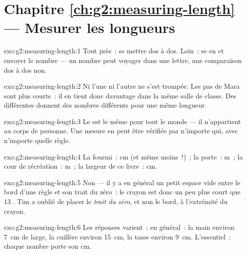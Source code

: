 \section*{Chapitre \ref{ch:g2:measuring-length} --- Mesurer les longueurs}

\begin{solution}{exo:g2:measuring-length:1}
Tout près~: se mettre dos à dos. Loin~: se  en  et
envoyer le nombre --- un nombre peut voyager dans une lettre, une
comparaison dos à dos non.
\end{solution}

\begin{solution}{exo:g2:measuring-length:2}
Ni l'une ni l'autre ne s'est trompée. Les pas de Mara sont plus
courts~: il en tient donc davantage dans la même salle de classe. Des
 différentes donnent des nombres différents pour une même
longueur.
\end{solution}

\begin{solution}{exo:g2:measuring-length:3}
Le  est le même pour tout le monde --- il n'appartient au
corps de personne. Une mesure en  peut être vérifiée par
n'importe qui, avec n'importe quelle règle.
\end{solution}

\begin{solution}{exo:g2:measuring-length:4}
La fourmi~: \unit{cm} (et même moins~!)~; la porte~: \unit{m}~; la
cour de récréation~: \unit{m}~; la largeur de ce livre~: \unit{cm}.
\end{solution}

\begin{solution}{exo:g2:measuring-length:5}
Non --- il y a en général un petit espace vide entre le bord d'une
règle et son trait du zéro~: le crayon est donc un peu plus court que
$13$ . Tim a oublié de placer le \emph{trait du zéro}, et
non le bord, à l'extrémité du crayon.
\end{solution}

\begin{solution}{exo:g2:measuring-length:6}
Les réponses varient~; en général~: la main environ \qty{7}{cm} de
large, la cuillère environ \qty{15}{cm}, la tasse environ
\qty{9}{cm}. L'essentiel~: chaque nombre porte son \unit{cm}.
\end{solution}

